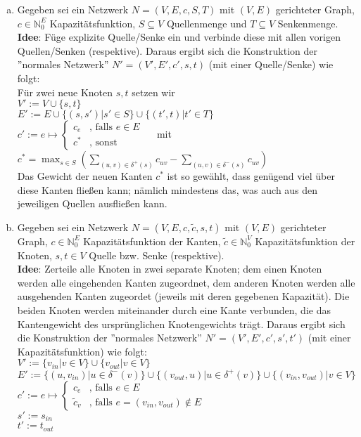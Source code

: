 \documentclass[11pt,a4paper,ngerman]{article}
\begin{document}
\begin{enumerate}[a)]
\item Gegeben sei ein Netzwerk $N = (V,E,c,S,T)$ mit $(V,E)$ gerichteter Graph, 
$c \in \mathbb{N}_0^E$ Kapazitätsfunktion,
$S \subseteq V$ Quellenmenge und $T \subseteq V$ Senkenmenge. \\
\textbf{Idee}: Füge explizite Quelle/Senke ein und verbinde diese mit allen vorigen Quellen/Senken (respektive).
Daraus ergibt sich die Konstruktion der ''normales Netzwerk'' $N' = (V', E', c', s, t)$ (mit einer
Quelle/Senke) wie folgt: \\

Für zwei neue Knoten $s,t$ setzen wir \\
$V' := V \cup \{ s,t \}$ \\
$E' := E \cup \{ (s,s') | s' \in S \} \cup \{(t',t) | t' \in T\}$ \\
$c' := e \mapsto \begin{cases}
			c_e & \text{, falls $e \in E$} \\
			c^* & \text{, sonst}
		      \end{cases} \quad$
		      mit $c^* = \max_{s \in S} \left( \sum_{(u,v) \in \delta^+(s)} c_{uv} -  \sum_{(u,v) \in \delta^-(s)} c_{uv}\right)$ \\

Das Gewicht der neuen Kanten $c^*$ ist so gewählt, dass genügend
viel über diese Kanten fließen kann; nämlich mindestens das,
was auch aus den jeweiligen Quellen ausfließen kann.
\item Gegeben sei ein Netzwerk $N = (V,E,c,\tilde{c},s,t)$ mit $(V,E)$ gerichteter Graph, 
$c \in \mathbb{N}_0^E$ Kapazitätsfunktion der Kanten,
$\tilde{c} \in \mathbb{N}_0^V$ Kapazitätsfunktion der Knoten,
$s,t \in V$ Quelle bzw. Senke (respektive). \\
\textbf{Idee}: Zerteile alle Knoten in zwei separate Knoten;
dem einen Knoten werden alle eingehenden Kanten zugeordnet,
dem anderen Knoten werden alle ausgehenden Kanten zugeordet
(jeweils mit deren gegebenen Kapazität).
Die beiden Knoten werden miteinander durch eine Kante verbunden,
die das Kantengewicht des ursprünglichen Knotengewichts trägt.
Daraus ergibt sich die Konstruktion der ''normales Netzwerk'' 
$N' = (V', E', c', s', t')$ (mit einer Kapazitätsfunktion) wie folgt: \\

$V' := \{ v_{in} | v \in V \} \cup \{v_{out} | v \in V \}$ \\
$E' := \{ (u,v_{in}) | u \in \delta^-(v)\} \cup \{ (v_{out},u) | u \in \delta^+(v) \} \cup \{(v_{in},v_{out}) | v \in V \}$ \\
$c' := e \mapsto \begin{cases}
			c_e & \text{, falls $e \in E$} \\
			\tilde{c}_v & \text{, falls $e = (v_{in},v_{out}) \notin E$}
		      \end{cases} $ \\
$s' := s_{in}$ \\
$t' := t_{out}$ \\


\end{enumerate}
\end{document}
